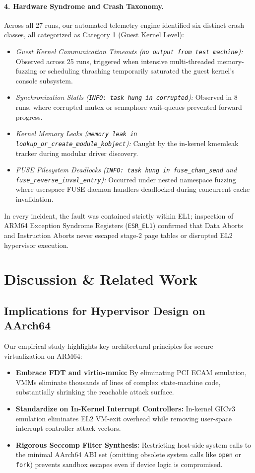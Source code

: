\documentclass{article}
\begin{document}
\paragraph{4. Hardware Syndrome and Crash Taxonomy.}
Across all 27 runs, our automated telemetry engine identified six distinct crash classes, all categorized as Category 1 (Guest Kernel Level):
\begin{itemize}[leftmargin=*]
    \item \emph{Guest Kernel Communication Timeouts (\texttt{no output from test machine}):} Observed across 25 runs, triggered when intensive multi-threaded memory-fuzzing or scheduling thrashing temporarily saturated the guest kernel's console subsystem.
    \item \emph{Synchronization Stalls (\texttt{INFO: task hung in corrupted}):} Observed in 8 runs, where corrupted mutex or semaphore wait-queues prevented forward progress.
    \item \emph{Kernel Memory Leaks (\texttt{memory leak in lookup\_or\_create\_module\_kobject}):} Caught by the in-kernel kmemleak tracker during modular driver discovery.
    \item \emph{FUSE Filesystem Deadlocks (\texttt{INFO: task hung in fuse\_chan\_send} and \texttt{fuse\_reverse\_inval\_entry}):} Occurred under nested namespace fuzzing where userspace FUSE daemon handlers deadlocked during concurrent cache invalidation.
\end{itemize}
In every incident, the fault was contained strictly within EL1; inspection of ARM64 Exception Syndrome Registers (\texttt{ESR\_EL1}) confirmed that Data Aborts and Instruction Aborts never escaped stage-2 page tables or disrupted EL2 hypervisor execution.


\section{Discussion \& Related Work}\label{sec:conclusion}

\subsection{Implications for Hypervisor Design on AArch64}
Our empirical study highlights key architectural principles for secure virtualization on ARM64:
\begin{itemize}[leftmargin=*]
    \item \textbf{Embrace FDT and virtio-mmio:} By eliminating PCI ECAM emulation, VMMs eliminate thousands of lines of complex state-machine code, substantially shrinking the reachable attack surface.
    \item \textbf{Standardize on In-Kernel Interrupt Controllers:} In-kernel GICv3 emulation eliminates EL2 VM-exit overhead while removing user-space interrupt controller attack vectors.
    \item \textbf{Rigorous Seccomp Filter Synthesis:} Restricting host-side system calls to the minimal AArch64 ABI set (omitting obsolete system calls like \texttt{open} or \texttt{fork}) prevents sandbox escapes even if device logic is compromised.
\end{itemize}
\end{document}
